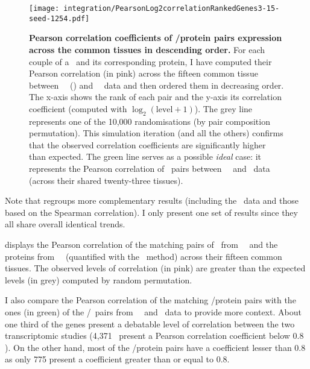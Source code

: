 \begin{figure}[!htb]
    \texttt{[image: integration/PearsonLog2correlationRankedGenes3-15-seed-1254.pdf]}\centering
    \vspace{-2mm}
    \caption[Pearson correlation coefficients of \mRNA/protein pairs expression
    across the common tissues in descending order]
    {\label{fig:GeneProtCor}\textbf{Pearson correlation coefficients of \mRNA/protein
    pairs expression across the common tissues in descending order.}
    For each couple of a \mRNA\ and its corresponding protein,
    I have computed their Pearson correlation (in pink)
    across the fifteen common tissue
    between \pandey\ \etal\ (\PPKM) and \uhlen\ \etal\ data
    and then ordered them in decreasing order.
    The x-axis shows the rank of each pair
    and the y-axis its correlation coefficient
    (computed with $\log_2(\text{level}+1)$).
    The grey line represents one of the 10,000 randomisations
    (by pair composition permutation).
    This simulation iteration (and all the others) confirms
    that the observed correlation coefficients are
    significantly higher than expected.
    The green line serves as a possible \emph{ideal} case:
    it represents the Pearson correlation of \mRNAs\ pairs
    between \uhlen\ \etal\ and \gtex\ data
    (across their shared twenty-three tissues).
    }
    \vspace{-1em}
\end{figure}

Note that  regroups more complementary results
(including the \gtex\ data and those based on the Spearman correlation).
I only present one set of results
since they all share overall identical trends.

 displays the Pearson correlation
of the matching pairs of \mRNAs\ from \uhlen\ \etal\
and the proteins from \pandey\ \etal\ (quantified with the \PPKM\ method)
across their fifteen common tissues.
The observed levels of correlation (in pink)  are greater
than the expected levels (in grey) computed by random permutation.

I also compare the Pearson correlation of the matching \mRNAs/protein pairs
with the ones (in green) of the \mRNAs{}/\mRNAs\ pairs
from \uhlen\ \etal\ and \gtex\ data
to provide more context.
About one third of the genes present a debatable level of correlation
between the two transcriptomic studies
(4,371 \mRNAs\ present a Pearson correlation coefficient below $0.8$).
On the other hand, most of the \mRNA/protein pairs have a coefficient
lesser than $0.8$ as only 775 present
a coefficient greater than or equal to $0.8$.

